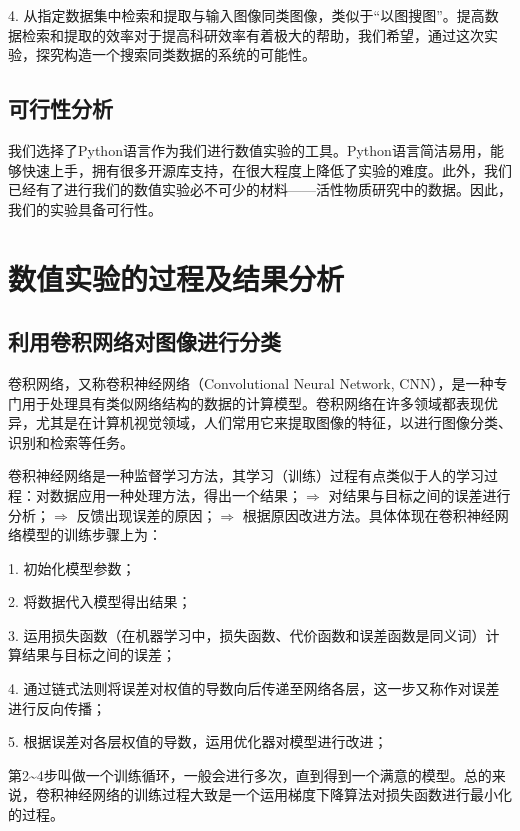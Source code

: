 4. 从指定数据集中检索和提取与输入图像同类图像，类似于“以图搜图”。提高数据检索和提取的效率对于提高科研效率有着极大的帮助，我们希望，通过这次实验，探究构造一个搜索同类数据的系统的可能性。

\subsection{可行性分析}
我们选择了Python语言作为我们进行数值实验的工具。Python语言简洁易用，能够快速上手，拥有很多开源库支持，在很大程度上降低了实验的难度。此外，我们已经有了进行我们的数值实验必不可少的材料——活性物质研究中的数据。因此，我们的实验具备可行性。


\section{数值实验的过程及结果分析}
\subsection{利用卷积网络对图像进行分类}
卷积网络，又称卷积神经网络（Convolutional Neural Network, CNN），是一种专门用于处理具有类似网络结构的数据的计算模型\cite{DL}。卷积网络在许多领域都表现优异，尤其是在计算机视觉领域，人们常用它来提取图像的特征，以进行图像分类、识别和检索等任务。

卷积神经网络是一种监督学习方法，其学习（训练）过程有点类似于人的学习过程：对数据应用一种处理方法，得出一个结果；$\Rightarrow$ 对结果与目标之间的误差进行分析；$\Rightarrow$ 反馈出现误差的原因；$\Rightarrow$ 根据原因改进方法。具体体现在卷积神经网络模型的训练步骤上为：

1. 初始化模型参数；

2. 将数据代入模型得出结果；

3. 运用损失函数（在机器学习中，损失函数、代价函数和误差函数是同义词\cite{DL}）计算结果与目标之间的误差；

4. 通过链式法则将误差对权值的导数向后传递至网络各层，这一步又称作对误差进行反向传播\cite{DL}；

5. 根据误差对各层权值的导数，运用优化器对模型进行改进；

第2\textasciitilde 4步叫做一个训练循环，一般会进行多次，直到得到一个满意的模型。总的来说，卷积神经网络的训练过程大致是一个运用梯度下降算法\cite{DL}对损失函数进行最小化的过程。

